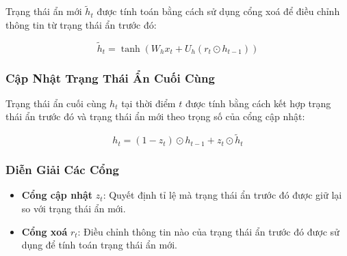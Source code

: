 Trạng thái ẩn mới \( \tilde{h}_t \) được tính toán bằng cách sử dụng cổng xoá để điều chỉnh thông tin từ trạng thái ẩn trước đó:

\[
\tilde{h}_t = \tanh(W_h x_t + U_h (r_t \odot h_{t-1}))
\]

\subsubsection{Cập Nhật Trạng Thái Ẩn Cuối Cùng}

Trạng thái ẩn cuối cùng \( h_t \) tại thời điểm \( t \) được tính bằng cách kết hợp trạng thái ẩn trước đó và trạng thái ẩn mới theo trọng số của cổng cập nhật:

\[
h_t = (1 - z_t) \odot h_{t-1} + z_t \odot \tilde{h}_t
\]

\subsubsection{Diễn Giải Các Cổng}

\begin{itemize}
    \item \textbf{Cổng cập nhật} \( z_t \): Quyết định tỉ lệ mà trạng thái ẩn trước đó được giữ lại so với trạng thái ẩn mới.
    \item \textbf{Cổng xoá} \( r_t \): Điều chỉnh thông tin nào của trạng thái ẩn trước đó được sử dụng để tính toán trạng thái ẩn mới.
\end{itemize}